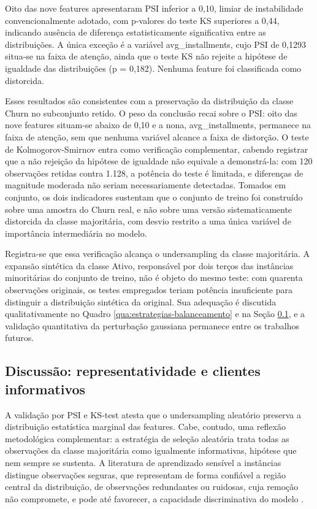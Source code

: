 Oito das nove features apresentaram PSI inferior a 0,10, limiar de instabilidade convencionalmente adotado, com p-valores do teste KS superiores a 0,44, indicando ausência de diferença estatisticamente significativa entre as distribuições. A única exceção é a variável avg\_installments, cujo PSI de 0,1293 situa-se na faixa de atenção, ainda que o teste KS não rejeite a hipótese de igualdade das distribuições (p = 0,182). Nenhuma feature foi classificada como distorcida.

Esses resultados são consistentes com a preservação da distribuição da classe Churn no subconjunto retido. O peso da conclusão recai sobre o PSI: oito das nove features situam-se abaixo de 0,10 e a nona, avg\_installments, permanece na faixa de atenção, sem que nenhuma variável alcance a faixa de distorção. O teste de Kolmogorov-Smirnov entra como verificação complementar, cabendo registrar que a não rejeição da hipótese de igualdade não equivale a demonstrá-la: com 120 observações retidas contra 1.128, a potência do teste é limitada, e diferenças de magnitude moderada não seriam necessariamente detectadas. Tomados em conjunto, os dois indicadores sustentam que o conjunto de treino foi construído sobre uma amostra do Churn real, e não sobre uma versão sistematicamente distorcida da classe majoritária, com desvio restrito a uma única variável de importância intermediária no modelo.

Registra-se que essa verificação alcança o undersampling da classe majoritária. A expansão sintética da classe Ativo, responsável por dois terços das instâncias minoritárias do conjunto de treino, não é objeto do mesmo teste: com quarenta observações originais, os testes empregados teriam potência insuficiente para distinguir a distribuição sintética da original. Sua adequação é discutida qualitativamente no Quadro \ref{qua:estrategias-balanceamento} e na Seção \ref{subsec:clientes-informativos}, e a validação quantitativa da perturbação gaussiana permanece entre os trabalhos futuros.

\subsection{Discussão: representatividade e clientes informativos} \label{subsec:clientes-informativos}

A validação por PSI e KS-test atesta que o undersampling aleatório preserva a distribuição estatística marginal das features. Cabe, contudo, uma reflexão metodológica complementar: a estratégia de seleção aleatória trata todas as observações da classe majoritária como igualmente informativas, hipótese que nem sempre se sustenta. A literatura de aprendizado sensível a instâncias distingue observações seguras, que representam de forma confiável a região central da distribuição, de observações redundantes ou ruidosas, cuja remoção não compromete, e pode até favorecer, a capacidade discriminativa do modelo \cite{kubat1997}.

